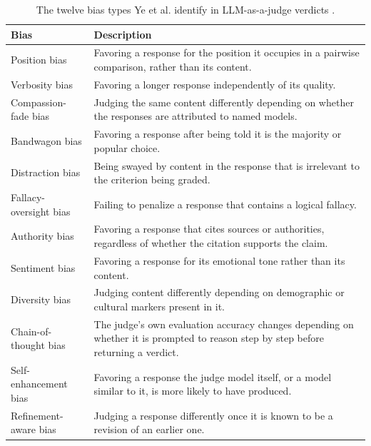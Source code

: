 \begin{table}[ht]
    \centering
    \renewcommand{\arraystretch}{1.2}
    \begin{tabularx}{0.9\textwidth}{@{}>{\raggedright\arraybackslash}p{3.4cm}X@{}}
        \toprule
        Bias & Description \\
        \midrule
        Position bias & Favoring a response for the position it occupies in a pairwise comparison, rather than its content. \\
        Verbosity bias & Favoring a longer response independently of its quality. \\
        Compassion-fade bias & Judging the same content differently depending on whether the responses are attributed to named models. \\
        Bandwagon bias & Favoring a response after being told it is the majority or popular choice. \\
        Distraction bias & Being swayed by content in the response that is irrelevant to the criterion being graded. \\
        Fallacy-oversight bias & Failing to penalize a response that contains a logical fallacy. \\
        Authority bias & Favoring a response that cites sources or authorities, regardless of whether the citation supports the claim. \\
        Sentiment bias & Favoring a response for its emotional tone rather than its content. \\
        Diversity bias & Judging content differently depending on demographic or cultural markers present in it. \\
        Chain-of-thought bias & The judge's own evaluation accuracy changes depending on whether it is prompted to reason step by step before returning a verdict. \\
        Self-enhancement bias & Favoring a response the judge model itself, or a model similar to it, is more likely to have produced. \\
        Refinement-aware bias & Judging a response differently once it is known to be a revision of an earlier one. \\
        \bottomrule
    \end{tabularx}
    \caption[The twelve bias types identified in LLM-as-a-judge verdicts]{The twelve bias types Ye et al. identify in LLM-as-a-judge verdicts \cite{yeJusticePrejudiceQuantifying2024a}.}
    \label{tab:llm-judge-biases}
\end{table}


